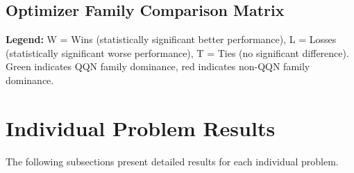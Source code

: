 \subsection{Optimizer Family Comparison Matrix}
\begin{table}[H]
\centering
\caption{Optimizer Family Comparison Matrix}
\label{tab:family_comparison_matrix}
\end{table}
\textbf{Legend:} W = Wins (statistically significant better performance), L = Losses (statistically significant worse performance), T = Ties (no significant difference). Green indicates QQN family dominance, red indicates non-QQN family dominance.

\section{Individual Problem Results}
The following subsections present detailed results for each individual problem.
